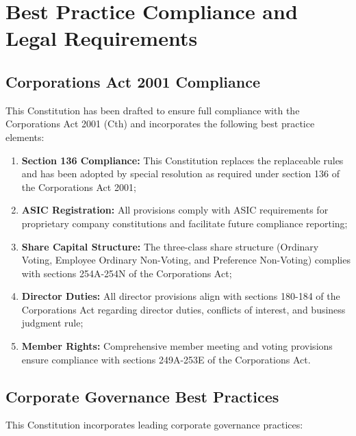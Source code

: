 \section{Best Practice Compliance and Legal Requirements}

\subsection{Corporations Act 2001 Compliance}

This Constitution has been drafted to ensure full compliance with the Corporations Act 2001 (Cth) and incorporates the following best practice elements:

\begin{enumerate}[label=(\alph*)]
    \item \textbf{Section 136 Compliance:} This Constitution replaces the replaceable rules and has been adopted by special resolution as required under section 136 of the Corporations Act 2001;
    
    \item \textbf{ASIC Registration:} All provisions comply with ASIC requirements for proprietary company constitutions and facilitate future compliance reporting;
    
    \item \textbf{Share Capital Structure:} The three-class share structure (Ordinary Voting, Employee Ordinary Non-Voting, and Preference Non-Voting) complies with sections 254A-254N of the Corporations Act;
    
    \item \textbf{Director Duties:} All director provisions align with sections 180-184 of the Corporations Act regarding director duties, conflicts of interest, and business judgment rule;
    
    \item \textbf{Member Rights:} Comprehensive member meeting and voting provisions ensure compliance with sections 249A-253E of the Corporations Act.
\end{enumerate}

\subsection{Corporate Governance Best Practices}

This Constitution incorporates leading corporate governance practices:

